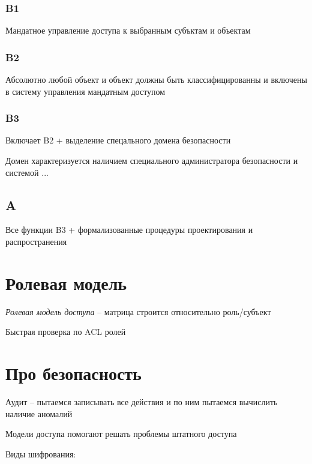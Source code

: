 \documentclass[12pt, a4paper]{article}
\begin{document}
\subsubsection{B1}

Мандатное управление доступа к выбранным субъктам и объектам

\subsubsection{B2}

Абсолютно любой объект и объект должны быть классифицированны и включены в систему управления мандатным доступом

\subsubsection{B3}

Включает B2 + выделение спецального домена безопасности

Домен характеризуется наличием специального администратора безопасности и системой ...

\subsection{A}

Все функции B3 + формализованные процедуры проектирования и распространения


\section{Ролевая модель}

\emph{Ролевая модель доступа} -- матрица строится относительно роль/субъект

Быстрая проверка по ACL ролей

\section{Про безопасность}

Аудит -- пытаемся записывать все действия и по ним пытаемся вычислить наличие аномалий

Модели доступа помогают решать проблемы штатного доступа

Виды шифрования: 
\end{document}

